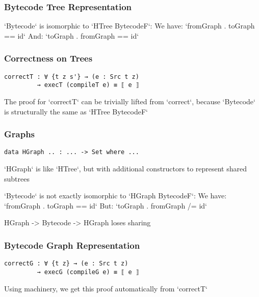         \begin{frame}[fragile]
            \frametitle{Bytecode Tree Representation}
            `Bytecode` is isomorphic to `HTree BytecodeF`:
            We have: `fromGraph . toGraph == id`
            And:     `toGraph . fromGraph == id`
\end{frame}
                
        \begin{frame}[fragile]
            \frametitle{Correctness on Trees}
            \begin{verbatim}
correctT : ∀ {t z s'} → (e : Src t z) 
         → execT (compileT e) ≡ ⟦ e ⟧
            \end{verbatim}
            The proof for `correctT` can be trivially lifted from `correct`,
            because `Bytecode` is structurally the same as `HTree BytecodeF`
\end{frame}

        \begin{frame}[fragile]
            \frametitle{Graphs}
            \begin{verbatim}
data HGraph .. : ... -> Set where ...
            \end{verbatim}
            
            `HGraph` is like `HTree`, but with additional constructors to represent shared subtrees
            
            `Bytecode` is not exactly isomorphic to `HGraph BytecodeF`:
            We have: `fromGraph . toGraph == id`
            But:     `toGraph . fromGraph /= id`
            
            HGraph -> Bytecode -> HGraph loses sharing
\end{frame}
         
         \begin{frame}[fragile]
            \frametitle{Bytecode Graph Representation}
            \begin{verbatim}
correctG : ∀ {t z} → (e : Src t z) 
         → execG (compileG e) ≡ ⟦ e ⟧
            \end{verbatim}
            
            Using machinery, we get this proof automatically from `correctT`
\end{frame}

